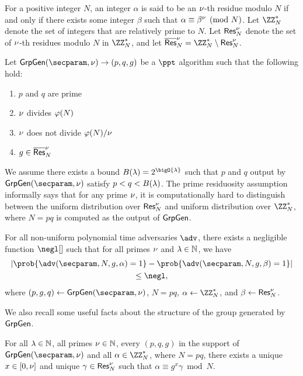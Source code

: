 For a positive integer $N$, an integer $\alpha$ is said to be an $\nu$-th residue modulo $N$ if and only if there exists some integer $\beta$ such that $\alpha \equiv \beta^\nu \pmod{N}$.
Let $\Z^\ast_N$ denote the set of integers that are relatively prime to $N$.
Let $\mathsf{Res}^{\nu}_{N}$ denote the set of $\nu$-th residues modulo $N$ in $\Z^\ast_N$, and let $\nonresmod{\bemod}{N} = \Z^\ast_N \setminus \resmod{\bemod}{N}$.

Let $\GrpGen(\secparam, \bemod) \rightarrow (p, q, g)$ be a $\ppt$ algorithm such that the following hold:
\begin{enumerate}
	\item $p$ and $q$ are prime
	\item $\nu$ divides $\varphi(N)$
	\item $\nu$ does not divide $\varphi(N) / \nu$
	\item $g \in \overline{\mathsf{Res}}^{\nu}_{N}$
\end{enumerate}
We assume there exists a bound $\bemodbound(\secpar) = 2^{\bigO{\secpar}}$ such that $p$ and $q$ output by $\GrpGen(\secparam, \bemod)$ satisfy $p < q < B(\lambda)$.
The prime residuosity assumption informally says that for any prime $\nu$, it is computationally hard to distinguish between the uniform distribution over $\mathsf{Res}^{\nu}_{N}$ and uniform distribution over $\Z^\ast_N$, where $N = pq$ is computed as the output of $\mathsf{GrpGen}$.

\begin{definition}\label{def:prime-residuosity}
	For all non-uniform polynomial time adversaries $\adv$, there exists a negligible function $\negl[]$ such that for all primes $\nu$ and $\lambda \in \mathbb{N}$, we have
	\begin{equation*}
		\begin{gathered}
			\left|\prob{\adv(\secparam, N, g, \alpha) = 1} - \prob{\adv(\secparam, N, g, \beta) = 1} \right| \\
			\le \negl,
		\end{gathered}
	\end{equation*}
	where $(p, g, q) \gets \GrpGen(\secparam, \bemod)$, $N = pq$, $\alpha \gets \Z^\ast_N$, and $\beta \gets \mathsf{Res}^{\nu}_{N}$.
\end{definition}

We also recall some useful facts about the structure of the group generated by $\mathsf{GrpGen}$.

\begin{lemma}\label{lemma:benaloh:unique-decomp}
	For all $\lambda \in \mathbb{N}$, all primes $\nu \in \mathbb{N}$, every $(p, q, g)$ in the support of $\GrpGen(\secparam, \bemod)$ and all $\alpha \in \Z^\ast_N$, where $N = pq$, there exists a unique $x \in [0, \nu]$ and unique $\gamma \in \mathsf{Res}^{\nu}_{N}$ such that $\alpha \equiv g^x \gamma \bmod{N}$.
\end{lemma}

